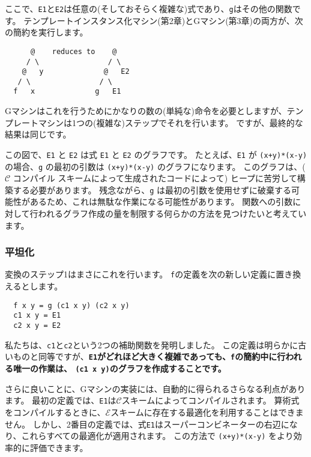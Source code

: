 \documentclass{jarticle}
\begin{document}
ここで、\texttt{E1}と\texttt{E2}は任意の(そしておそらく複雑な)式であり、\texttt{g}はその他の関数です。
テンプレートインスタンス化マシン(第2章)とGマシン(第3章)の両方が、次の簡約を実行します。

\begin{verbatim}
      @    reduces to    @
     / \                / \
    @   y              @   E2
   / \                / \
  f   x              g   E1
\end{verbatim}

Gマシンはこれを行うためにかなりの数の(単純な)命令を必要としますが、テンプレートマシンは1つの(複雑な)ステップでそれを行います。
ですが、最終的な結果は同じです。

この図で、\texttt{E1} と \texttt{E2} は式 \texttt{E1} と \texttt{E2} のグラフです。
たとえば、\texttt{E1} が \texttt{(x+y)*(x-y)} の場合、\texttt{g} の最初の引数は \texttt{(x+y)*(x-y)} のグラフになります。
このグラフは、($\mathcal{C}$ コンパイル スキームによって生成されたコードによって) ヒープに苦労して構築する必要があります。
残念ながら、\texttt{g} は最初の引数を使用せずに破棄する可能性があるため、これは無駄な作業になる可能性があります。
関数への引数に対して行われるグラフ作成の量を制限する何らかの方法を見つけたいと考えています。

\subsubsection{平坦化}

変換のステップ1はまさにこれを行います。
\texttt{f}の定義を次の新しい定義に置き換えるとします。

\begin{verbatim}
  f x y = g (c1 x y) (c2 x y)
  c1 x y = E1
  c2 x y = E2
\end{verbatim}

私たちは、\texttt{c1}と\texttt{c2}という2つの補助関数を発明しました。
この定義は明らかに古いものと同等ですが、\textbf{\texttt{E1}がどれほど大きく複雑であっても、\texttt{f}の簡約中に行われる唯一の作業は、
	\texttt{(c1 x y)}のグラフを作成することです。}

さらに良いことに、Gマシンの実装には、自動的に得られるさらなる利点があります。
最初の定義では、\texttt{E1}は$\mathcal{C}$スキームによってコンパイルされます。
算術式をコンパイルするときに、$\mathcal{E}$スキームに存在する最適化を利用することはできません。
しかし、2番目の定義では、式\texttt{E1}はスーパーコンビネーターの右辺になり、これらすべての最適化が適用されます。
この方法で \texttt{(x+y)*(x-y)} をより効率的に評価できます。
\end{document}
